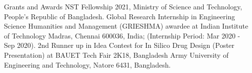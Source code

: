 
\begin{rubric}{Grants and Awards}
    \noentry{}
    \entry*[2021]
        NST Fellowship 2021, Ministry of Science and Technology, People's Republic of Bangladesh.
    \entry*[2020]
        Global Research Internship in Engineering Science Humanities and Management (GRIESHMA) awardee at Indian Institute of Technology Madras, Chennai 600036, India; (Internship Period: Mar 2020 - Sep 2020).
    \entry*[2018]
        2nd Runner up in Idea Contest for In Silico Drug Design (Poster Presentation) at BAUET Tech Fair 2K18, Bangladesh Army University of Engineering and Technology, Natore 6431, Bangladesh.
\end{rubric}
    
